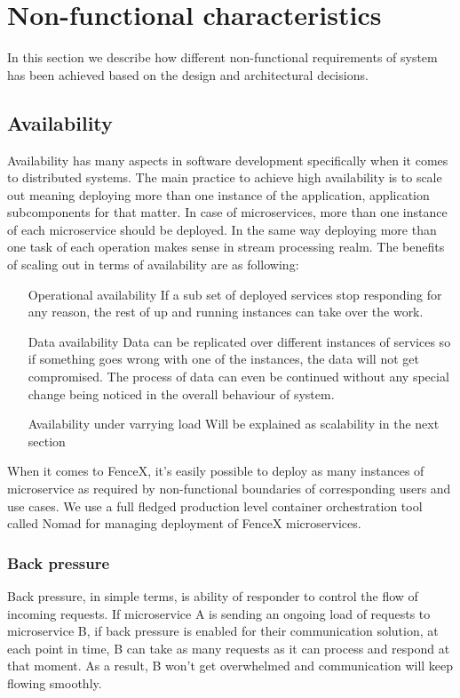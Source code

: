 \documentclass[a4]{report}
\begin{document}
        \section{Non-functional characteristics}
        In this section we describe how different non-functional requirements of system has been achieved based on the
        design and architectural decisions.

        \subsection{Availability}
        Availability has many aspects in software development specifically when it comes to distributed systems.
        The main practice to achieve high availability is to scale out meaning deploying more than one instance of the
        application, application subcomponents for that matter.
        In case of microservices, more than one instance of each microservice should be deployed.
        In the same way deploying more than one task of each operation makes sense in stream processing realm.
        The benefits of scaling out in terms of availability are as following:
        \begin{itemize}
            \item[Operational availability] If a sub set of deployed services stop responding for any reason, the rest of
            up and running instances can take over the work.
            \item[Data availability] Data can be replicated over different instances of services so if something goes
            wrong with one of the instances, the data will not get compromised.
            The process of data can even be continued without any special change being noticed in the overall behaviour of
            system.
            \item[Availability under varrying load] Will be explained as scalability in the next section
        \end{itemize}

        When it comes to FenceX, it's easily possible to deploy as many instances of microservice as required by
        non-functional boundaries of corresponding users and use cases.
        We use a full fledged production level container orchestration tool called Nomad\cite{nomad} for managing deployment of
        FenceX microservices.

        \subsubsection{Back pressure \cite{reactive-manifesto}}
        Back pressure, in simple terms, is ability of responder to control the flow of incoming requests.
        If microservice A is sending an ongoing load of requests to microservice B, if back pressure is enabled for
        their communication solution, at each point in time, B can take as many requests as it can process and respond at
        that moment.
        As a result, B won't get overwhelmed and communication will keep flowing smoothly.
\end{document}
